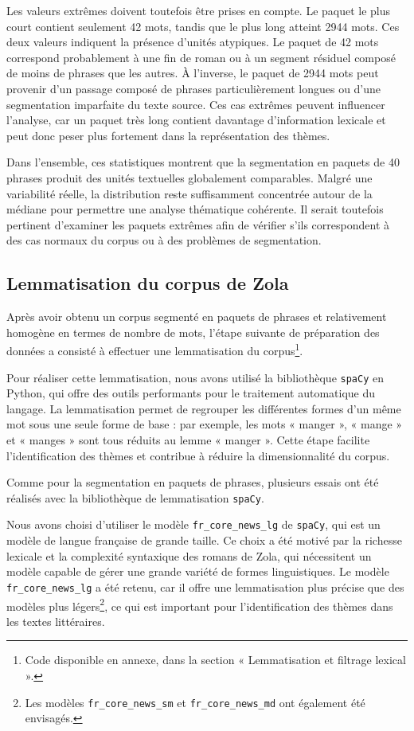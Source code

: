 Les valeurs extrêmes doivent toutefois être prises en compte. Le paquet le plus court contient seulement 42 mots, tandis que le plus long atteint 2944 mots. Ces deux valeurs indiquent la présence d'unités atypiques. Le paquet de 42 mots correspond probablement à une fin de roman ou à un segment résiduel composé de moins de phrases que les autres. À l'inverse, le paquet de 2944 mots peut provenir d'un passage composé de phrases particulièrement longues ou d'une segmentation imparfaite du texte source. Ces cas extrêmes peuvent influencer l'analyse, car un paquet très long contient davantage d'information lexicale et peut donc peser plus fortement dans la représentation des thèmes.

Dans l'ensemble, ces statistiques montrent que la segmentation en paquets de 40 phrases produit des unités textuelles globalement comparables. Malgré une variabilité réelle, la distribution reste suffisamment concentrée autour de la médiane pour permettre une analyse thématique cohérente. Il serait toutefois pertinent d'examiner les paquets extrêmes afin de vérifier s'ils correspondent à des cas normaux du corpus ou à des problèmes de segmentation.


\subsection{Lemmatisation du corpus de Zola}

Après avoir obtenu un corpus segmenté en paquets de phrases et relativement homogène en termes de nombre de mots, l'étape suivante de préparation des données a consisté à effectuer une lemmatisation du corpus\footnote{Code disponible en annexe, dans la section « Lemmatisation et filtrage lexical ».}.

Pour réaliser cette lemmatisation, nous avons utilisé la bibliothèque \texttt{spaCy} en Python, qui offre des outils performants pour le traitement automatique du langage. La lemmatisation permet de regrouper les différentes formes d'un même mot sous une seule forme de base : par exemple, les mots « manger », « mange » et « manges » sont tous réduits au lemme « manger ». Cette étape facilite l'identification des thèmes et contribue à réduire la dimensionnalité du corpus.

Comme pour la segmentation en paquets de phrases, plusieurs essais ont été réalisés avec la bibliothèque de lemmatisation \texttt{spaCy}.

Nous avons choisi d'utiliser le modèle \texttt{fr\_core\_news\_lg} de \texttt{spaCy}, qui est un modèle de langue française de grande taille. Ce choix a été motivé par la richesse lexicale et la complexité syntaxique des romans de Zola, qui nécessitent un modèle capable de gérer une grande variété de formes linguistiques. Le modèle \texttt{fr\_core\_news\_lg} a été retenu, car il offre une lemmatisation plus précise que des modèles plus légers\footnote{Les modèles \texttt{fr\_core\_news\_sm} et \texttt{fr\_core\_news\_md} ont également été envisagés.}, ce qui est important pour l'identification des thèmes dans les textes littéraires.


